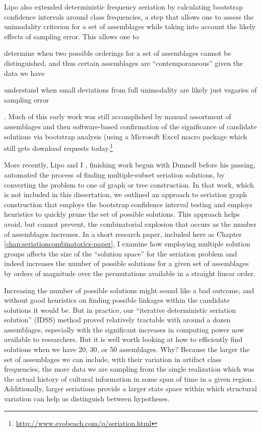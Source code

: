 Lipo also extended deterministic frequency seriation by calculating bootstrap confidence intervals around class frequencies, a step that allows one to assess the unimodality criterion for a set of assemblages while taking into account the likely effects of sampling error.  This allows one to \begin{dissparalist}
\item determine when two possible orderings for a set of assemblages cannot be distinguished, and thus certain assemblages are ``contemporaneous'' given the data we have
\item understand when small deviations from full unimodality are likely just vagaries of sampling error
\end{dissparalist}. Much of this early work was still accomplished by manual assortment of assemblages and then software-based confirmation of the significance of candidate solutions via bootstrap analysis (using a Microsoft Excel macro package which still gets download requests today.\footnote{\url{http://www.evobeach.com/p/seriation.html}}  

More recently, Lipo and I \citeyearpar{Lipo2015}, finishing work begun with Dunnell before his passing, automated the process of finding multiple-subset seriation solutions, by converting the problem to one of graph or tree construction. In that work, which is not included in this dissertation, we outlined an approach to seriation graph construction that employs the bootstrap confidence interval testing and employs heuristics to quickly prune the set of possible solutions. This approach helps avoid, but cannot prevent, the combinatorial explosion that occurs as the number of assemblages increases. In a short research paper, included here as Chapter \ref{chap:seriationcombinatorics-paper}, I examine how employing multiple solution groups affects the size of the “solution space” for the seriation problem and indeed increases the number of possible solutions for a given set of assemblages by orders of magnitude over the permutations available in a straight linear order.

Increasing the number of possible solutions might sound like a bad outcome, and without good heuristics on finding possible linkages within the candidate solutions it would be. But in practice, our “iterative deterministic seriation solution” (IDSS) method proved relatively tractable with around a dozen assemblages, especially with the significant increases in computing power now available to researchers. But it is well worth looking at how to efficiently find solutions when we have 20, 30, or 50 assemblages. Why? Because the larger the set of assemblages we can include, with their variation in artifact class frequencies, the more data we are sampling from the single realization which was the actual history of cultural information in some span of time in a given region.  Additionally, larger seriations provide a larger state space within which structural variation can help us distinguish between hypotheses.

